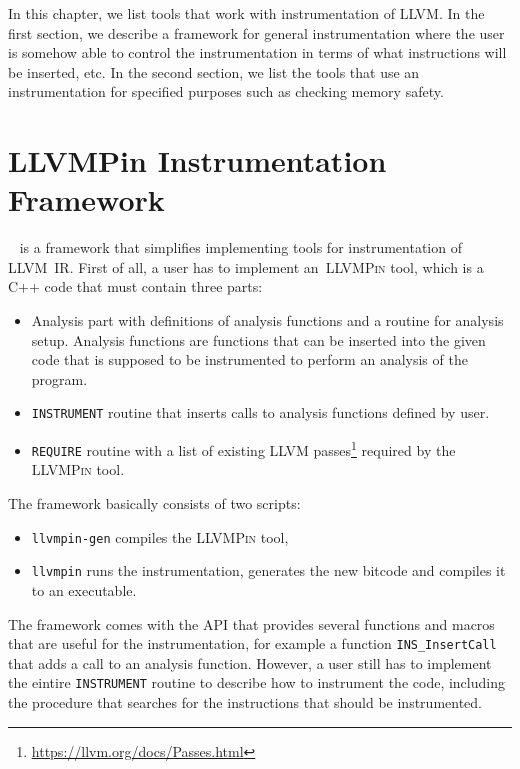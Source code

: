 In this chapter, we list tools that work with instrumentation of LLVM. In the
first section, we describe a framework for general instrumentation where the
user is somehow able to control the instrumentation in terms of what
instructions will be inserted, etc. In the second section, we list the tools
that use an instrumentation for specified purposes such as checking memory
safety.

\section{LLVMPin Instrumentation Framework}\label{sec:llvmpin}

\llvmpin~\cite{llvmpin} is a framework that simplifies implementing tools for
instrumentation of LLVM~IR. First of all, a user has to implement
an~\textsc{LLVMPin} tool, which is a C++ code that must contain three parts:

\begin{itemize}
    \item Analysis part with definitions of analysis functions and a routine
    for analysis setup. Analysis functions are functions that can be inserted
        into the given code that is supposed to be instrumented to perform an
        analysis of the program.
    \item \texttt{INSTRUMENT} routine that inserts calls to analysis functions
    defined by user.
    \item \texttt{REQUIRE} routine with a list of existing LLVM
    passes\footnote{\url{https://llvm.org/docs/Passes.html}} required
    by the \textsc{LLVMPin} tool.
\end{itemize}

The framework basically consists of two scripts:

\begin{itemize}
    \item \texttt{llvmpin-gen} compiles the \textsc{LLVMPin} tool,
    \item \texttt{llvmpin} runs the instrumentation, generates the new bitcode
    and compiles it to an executable.
\end{itemize}

The framework comes with the API that provides several functions and macros
that are useful for the instrumentation, for example a function
\texttt{INS\_InsertCall} that adds a call to an analysis function. However, a
user still has to implement the eintire \texttt{INSTRUMENT} routine to describe
how to instrument the code, including the procedure that searches for the
instructions that should be instrumented.

